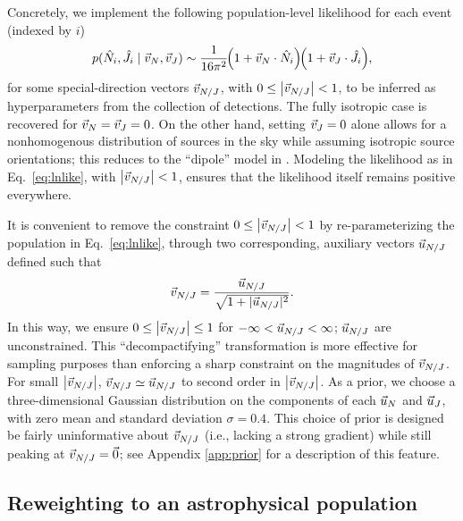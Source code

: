 \documentclass[aps,prd,twocolumn,superscriptaddress,preprintnumbers,floatfix,nofootinbib]{revtex4-2}
\begin{document}
Concretely, we implement the following population-level likelihood for each event (indexed by $i$)
\begin{equation}
\label{eq:lnlike}
p(\hat{N}_i,\hat{J}_i \mid \vec{v}_{N}, \vec{v}_{J}) \sim \frac{1}{16 \pi^2}  \hspace{-3pt}\left(1 + \vec{v}_{N} \cdot \hat{N}_i\right) \hspace{-3pt} \left(1 + \vec{v}_{J} \cdot \hat{J}_i\right) \hspace{-2pt} ,
\end{equation}
for some special-direction vectors $\vec{v}_{N/J}$, with $0 \leq \left| \vec{v}_{N/J} \right| < 1$, to be inferred as hyperparameters from the collection of detections.
The fully isotropic case is recovered for $\vec{v}_{N} = \vec{v}_{J} = 0$.
On the other hand, setting $\vec{v}_{J} = 0$ alone allows for a nonhomogenous distribution of sources in the sky while assuming isotropic source orientations; this reduces to the ``dipole'' model in \cite{Essick:2022slj}.
Modeling the likelihood as in Eq.~\eqref{eq:lnlike}, with $\left| \vec{v}_{N/J} \right| < 1$, ensures that the likelihood itself remains positive everywhere.

It is convenient to remove the constraint $0 \leq \left| \vec{v}_{N/J} \right| <
1$ by re-parameterizing the population in Eq.~\eqref{eq:lnlike}, through two
corresponding, auxiliary vectors $\vec{u}_{N/J}$ defined such that
\begin{equation}
\vec{v}_{N/J} = \frac{\vec{u}_{N/J} }{\sqrt{1 + |\vec{u}_{N/J}|^2}} .
\end{equation}
In this way, we ensure $0 \leq \left| \vec{v}_{N/J} \right| \leq 1$ for $-\infty <
\vec{u}_{N/J} < \infty$; $\vec{u}_{N/J}$ are unconstrained.  This ``decompactifying'' transformation
is more effective for sampling purposes than enforcing a sharp constraint on the
magnitudes of $\vec{v}_{N/J}$. For small $\left| \vec{v}_{N/J} \right|$, $\vec{v}_{N/J}
\simeq \vec{u}_{N/J}$ to second order in $\left| \vec{v}_{N/J} \right|$. As a prior, we choose a three-dimensional Gaussian distribution on the components of
each $\vec{u}_{N}$ and $\vec{u}_{J}$, with zero mean and standard deviation
$\sigma = 0.4$. This choice of prior is designed be fairly uninformative about
$\vec{v}_{N/J}$ (i.e., lacking a strong gradient) while still peaking at $\vec{v}_{N/J} = \vec{0}$; see Appendix
\ref{app:prior} for a description of this feature.

\subsection{Reweighting to an astrophysical population}
\label{sec:reweight}
\end{document}
